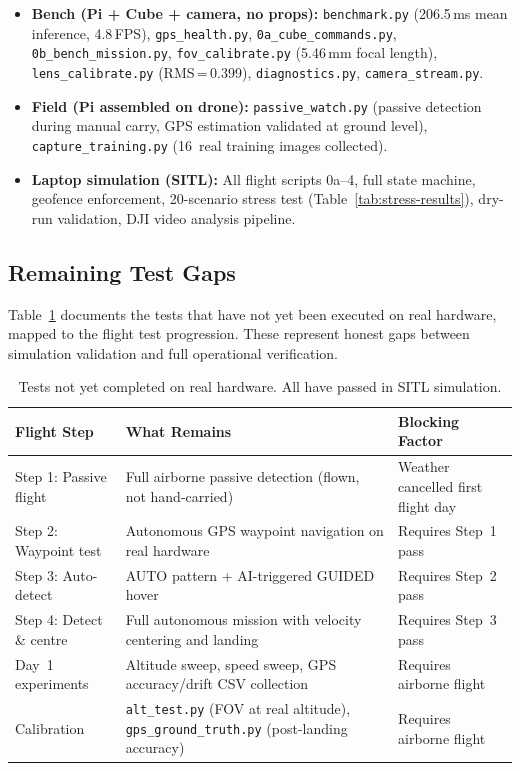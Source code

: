 \begin{itemize}
    \item \textbf{Bench (Pi + Cube + camera, no props):} \texttt{benchmark.py} (206.5\,ms mean inference, 4.8\,FPS), \texttt{gps\_health.py}, \texttt{0a\_cube\_commands.py}, \texttt{0b\_bench\_mission.py}, \texttt{fov\_calibrate.py} (5.46\,mm focal length), \texttt{lens\_calibrate.py} (RMS\,=\,0.399), \texttt{diagnostics.py}, \texttt{camera\_stream.py}.
    \item \textbf{Field (Pi assembled on drone):} \texttt{passive\_watch.py} (passive detection during manual carry, GPS estimation validated at ground level), \texttt{capture\_training.py} (16~real training images collected).
    \item \textbf{Laptop simulation (SITL):} All flight scripts 0a--4, full state machine, geofence enforcement, 20-scenario stress test (Table~\ref{tab:stress-results}), dry-run validation, DJI video analysis pipeline.
\end{itemize}

\subsection{Remaining Test Gaps}\label{sec:test-gaps}

Table~\ref{tab:test-gaps} documents the tests that have not yet been executed on real hardware, mapped to the flight test progression.  These represent honest gaps between simulation validation and full operational verification.

\begin{table}[H]
\centering
\caption{Tests not yet completed on real hardware.  All have passed in SITL simulation.}
\label{tab:test-gaps}
\small
\begin{tabular}{@{}lp{5.5cm}p{5.0cm}@{}}
\toprule
\textbf{Flight Step} & \textbf{What Remains} & \textbf{Blocking Factor} \\
\midrule
Step 1: Passive flight & Full airborne passive detection (flown, not hand-carried) & Weather cancelled first flight day \\
\addlinespace
Step 2: Waypoint test & Autonomous GPS waypoint navigation on real hardware & Requires Step~1 pass \\
\addlinespace
Step 3: Auto-detect & AUTO pattern + AI-triggered GUIDED hover & Requires Step~2 pass \\
\addlinespace
Step 4: Detect \& centre & Full autonomous mission with velocity centering and landing & Requires Step~3 pass \\
\addlinespace
Day~1 experiments & Altitude sweep, speed sweep, GPS accuracy/drift CSV collection & Requires airborne flight \\
\addlinespace
Calibration & \texttt{alt\_test.py} (FOV at real altitude), \texttt{gps\_ground\_truth.py} (post-landing accuracy) & Requires airborne flight \\
\bottomrule
\end{tabular}
\end{table}

